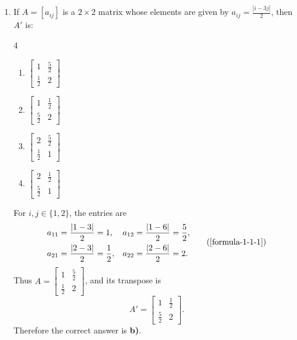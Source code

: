 \begin{enumerate}[label={},font=\normalfont,leftmargin=1.15cm,labelwidth=1.0cm,labelsep=0.15cm,itemindent=0pt,listparindent=0pt,itemsep=\baselineskip,parsep=0pt,topsep=0pt]
\item[4.1.2] If $A=[a_{ij}]$ is a $2\times2$ matrix whose elements are given by $a_{ij}=\frac{|i-3j|}{2}$, then $A'$ is:

\begin{multicols}{4}
\begin{enumerate}
\setlength{\itemsep}{0pt}
    \item $\begin{bmatrix}1&\frac{5}{2}\\[2pt]\frac{1}{2}&2\end{bmatrix}$
    \item $\begin{bmatrix}1&\frac{1}{2}\\[2pt]\frac{5}{2}&2\end{bmatrix}$
    \item $\begin{bmatrix}2&\frac{5}{2}\\[2pt]\frac{1}{2}&1\end{bmatrix}$
    \item $\begin{bmatrix}2&\frac{1}{2}\\[2pt]\frac{5}{2}&1\end{bmatrix}$
\end{enumerate}
\end{multicols}

\vspace{0.6em}\par\solution


For $i,j\in\{1,2\}$, the entries are
\begin{equation*}
\begin{aligned}
a_{11}&=\frac{|1-3|}{2}=1, & a_{12}&=\frac{|1-6|}{2}=\frac52,\\
a_{21}&=\frac{|2-3|}{2}=\frac12, & a_{22}&=\frac{|2-6|}{2}=2.
\end{aligned}
\tag*{(\ref{formula-1-1-1})}\end{equation*}
Thus $A=\begin{bmatrix}1&\frac52\\[2pt]\frac12&2\end{bmatrix}$, and its transpose is
\[
A'=\begin{bmatrix}1&\frac12\\[2pt]\frac52&2\end{bmatrix}.
\]
Therefore the correct answer is \textbf{b)}.


\end{enumerate}
